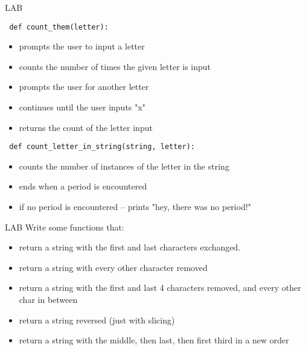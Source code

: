 \documentclass{beamer}
\begin{document}
\begin{frame}[fragile]{LAB}

\verb| def count_them(letter): |
\begin{itemize}
  \item prompts the user to input a letter
  \item counts the number of times the given letter is input
  \item prompts the user for another letter
  \item continues until the user inputs "x"
  \item returns the count of the letter input
\end{itemize}

\verb| def count_letter_in_string(string, letter): |
\begin{itemize}
  \item counts the number of instances of the letter in the string
  \item ends when a period is encountered
  \item if no period is encountered -- prints "hey, there was no period!"
\end{itemize}
\end{frame}

\begin{frame}[fragile]{LAB}
Write some functions that:
\begin{itemize}
  \item return a string with the first and last characters exchanged.
  \item return a string with every other character removed
  \item return a string with the first and last 4 characters removed, and every other char in between
  \item return a string reversed (just with slicing)
  \item return a string with the middle, then last, then first third in a new order
\end{itemize}

\end{frame}
\end{document}

